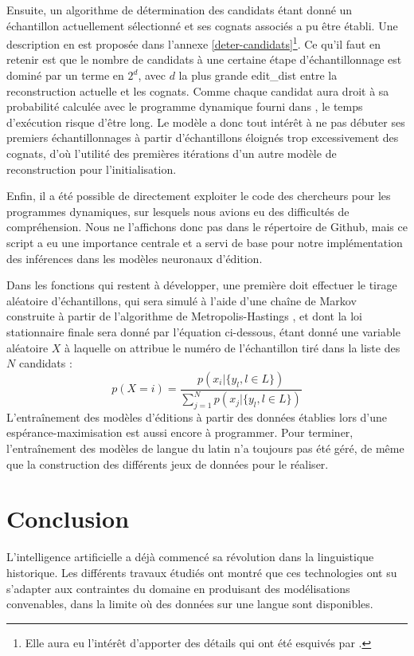 \documentclass[12pt, twoside]{report}
\begin{document}
\vspace{12pt}
Ensuite, un algorithme de détermination des candidats étant donné un échantillon actuellement sélectionné et ses \glspl{cognat} associés a pu être établi. Une description en est proposée dans l'annexe \ref{deter-candidats}\footnote{Elle aura eu l'intérêt d'apporter des détails qui ont été esquivés par \cite{he2022neural}.}.
Ce qu'il faut en retenir est que le nombre de candidats à une certaine étape d'échantillonnage est dominé par un terme en $2^d$, avec $d$ la plus grande \gls{edit_dist} entre la reconstruction actuelle et les \glspl{cognat}. Comme chaque candidat aura droit à sa probabilité calculée avec le programme dynamique fourni dans \autocite[section A.2]{he2022neural}, le temps d'exécution risque d'être long. Le modèle a donc tout intérêt à ne pas débuter ses premiers échantillonnages à partir d'échantillons éloignés trop excessivement des \glspl{cognat}, d'où l'utilité des premières itérations d'un autre modèle de reconstruction pour l'initialisation.

\vspace{12pt}
Enfin, il a été possible de directement exploiter le code des chercheurs pour les programmes dynamiques, sur lesquels nous avions eu des difficultés de compréhension. Nous ne l'affichons donc pas dans le répertoire de Github, mais ce script a eu une importance centrale et a servi de base pour notre implémentation des inférences dans les modèles neuronaux d'édition.

\vspace{12pt}
Dans les fonctions qui restent à développer, une première doit effectuer le tirage aléatoire d'échantillons, qui sera simulé à l'aide d'une chaîne de Markov construite à partir de l'algorithme de Metropolis-Hastings \autocite{metro_has}, et dont la loi stationnaire finale sera donné par l'équation ci-dessous, étant donné une variable aléatoire $X$ à laquelle on attribue le numéro de l'échantillon tiré dans la liste des $N$ candidats :
\begin{equation}
    p(X=i)=\frac{p(x_i|\{y_l, l\in L\})}{\sum_{j=1}^{N}p(x_j|\{y_l, l\in L\})}
\end{equation}
L'entraînement des modèles d'éditions à partir des données établies lors d'une espérance-maximisation est aussi encore à programmer. Pour terminer, l'entraînement des modèles de langue du latin n'a toujours pas été géré, de même que la construction des différents jeux de données pour le réaliser.

\chapter{Conclusion}
L'intelligence artificielle a déjà commencé sa révolution dans la linguistique historique. Les différents travaux étudiés ont montré que ces technologies ont su s'adapter aux contraintes du domaine en produisant des modélisations convenables, dans la limite où des données sur une langue sont disponibles. 
\end{document}
